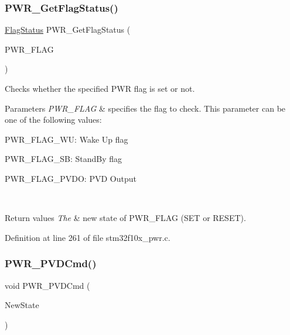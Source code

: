 \subsubsection{\texorpdfstring{P\+W\+R\+\_\+\+Get\+Flag\+Status()}{PWR\_GetFlagStatus()}}
{\footnotesize\ttfamily \hyperlink{group___exported__types_ga89136caac2e14c55151f527ac02daaff}{Flag\+Status} P\+W\+R\+\_\+\+Get\+Flag\+Status (\begin{DoxyParamCaption}\item[{uint32\+\_\+t}]{P\+W\+R\+\_\+\+F\+L\+AG }\end{DoxyParamCaption})}



Checks whether the specified P\+WR flag is set or not. 


\begin{DoxyParams}{Parameters}
{\em P\+W\+R\+\_\+\+F\+L\+AG} & specifies the flag to check. This parameter can be one of the following values\+: \begin{DoxyItemize}
\item P\+W\+R\+\_\+\+F\+L\+A\+G\+\_\+\+WU\+: Wake Up flag \item P\+W\+R\+\_\+\+F\+L\+A\+G\+\_\+\+SB\+: Stand\+By flag \item P\+W\+R\+\_\+\+F\+L\+A\+G\+\_\+\+P\+V\+DO\+: P\+VD Output \end{DoxyItemize}
\\
\hline
\end{DoxyParams}

\begin{DoxyRetVals}{Return values}
{\em The} & new state of P\+W\+R\+\_\+\+F\+L\+AG (S\+ET or R\+E\+S\+ET). \\
\hline
\end{DoxyRetVals}


Definition at line 261 of file stm32f10x\+\_\+pwr.\+c.

\mbox{\label{group___p_w_r___exported___functions_ga42cad476b816e0a33594a933b3ed1acd}} 
\subsubsection{\texorpdfstring{P\+W\+R\+\_\+\+P\+V\+D\+Cmd()}{PWR\_PVDCmd()}}
{\footnotesize\ttfamily void P\+W\+R\+\_\+\+P\+V\+D\+Cmd (\begin{DoxyParamCaption}\item[{\hyperlink{group___exported__types_gac9a7e9a35d2513ec15c3b537aaa4fba1}{Functional\+State}}]{New\+State }\end{DoxyParamCaption})}



